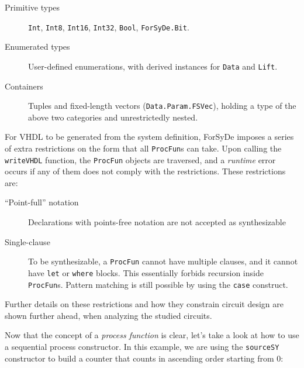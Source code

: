 \documentclass[a4paper]{article}
\begin{document}
                \begin{description}
                    \item[Primitive types] \texttt{Int}, \texttt{Int8}, \texttt{Int16},
                        \texttt{Int32}, \texttt{Bool}, \texttt{ForSyDe.Bit}.
                    \item[Enumerated types] User-defined enumerations, with derived instances for
                        \texttt{Data} and \texttt{Lift}.
                    \item[Containers] Tuples and fixed-length vectors (\texttt{Data.Param.FSVec}),
                        holding a type of the above two categories and unrestrictedly nested.
                \end{description}

                For VHDL to be generated from the system definition, ForSyDe imposes a series
                of extra restrictions on the form that all \texttt{ProcFun}s can take. Upon calling
                the \texttt{writeVHDL} function, the \texttt{ProcFun} objects are traversed, and a
                \emph{runtime} error occurs if any of them does not comply with the restrictions.
                These restrictions are:

                \begin{description}
                    \item[``Point-full'' notation] Declarations with points-free notation are not
                        accepted as synthesizable
                    \item[Single-clause] To be synthesizable, a \texttt{ProcFun} cannot have
                        multiple clauses, and it cannot have \texttt{let} or \texttt{where} blocks.
                        This essentially forbids recursion inside \texttt{ProcFun}s. Pattern
                        matching is still possible by using the \texttt{case} construct.
                \end{description}

                Further details on these restrictions and how they constrain circuit design are
                shown further ahead, when analyzing the studied circuits.

                Now that the concept of a \emph{process function} is clear, let's take a look at how
                to use a sequential process constructor. In this example, we are using the
                \texttt{sourceSY} constructor to build a counter that counts in ascending order
                starting from 0:
\end{document}
